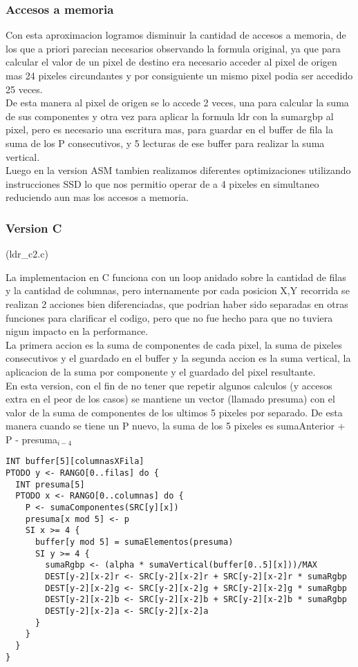 \subsubsection*{Accesos a memoria}

Con esta aproximacion logramos disminuir la cantidad de accesos a memoria, de los que a priori parecian necesarios observando la formula original, ya que para calcular el valor de un pixel de destino era necesario acceder al pixel de origen mas 24 pixeles circundantes y por consiguiente un mismo pixel podia ser accedido 25 veces. \\
De esta manera al pixel de origen se lo accede 2 veces, una para calcular la suma de sus componentes y otra vez para aplicar la formula ldr con la sumargbp al pixel, pero es necesario una escritura mas, para guardar en el buffer de fila la suma de los P consecutivos, y 5 lecturas de ese buffer para realizar la suma vertical. \\
Luego en la version ASM tambien realizamos diferentes optimizaciones utilizando instrucciones SSD lo que nos permitio operar de a 4 pixeles en simultaneo reduciendo aun mas los accesos a memoria.

\subsubsection*{Version C} (ldr_c2.c)

La implementacion en C funciona con un loop anidado sobre la cantidad de filas y la cantidad de columnas, pero internamente por cada posicion X,Y recorrida se realizan 2 acciones bien diferenciadas, que podrian haber sido separadas en otras funciones para clarificar el codigo, pero que no fue hecho para que no tuviera nigun impacto en la performance.\\
La primera accion es la suma de componentes de cada pixel, la suma de pixeles consecutivos y el guardado en el buffer y la segunda accion es la suma vertical, la aplicacion de la suma por componente y el guardado del pixel resultante.\\
En esta version, con el fin de no tener que repetir algunos calculos (y accesos extra en el peor de los casos) se mantiene un vector (llamado presuma) con el valor de la suma de componentes de los ultimos 5 pixeles por separado.
De esta manera cuando se tiene un P nuevo, la suma de los 5 pixeles es sumaAnterior + P - presuma$_{i-4}$ 

\begin{lstlisting}[frame=single]
INT buffer[5][columnasXFila]
PTODO y <- RANGO[0..filas] do { 
  INT presuma[5]
  PTODO x <- RANGO[0..columnas] do {
    P <- sumaComponentes(SRC[y][x])
    presuma[x mod 5] <- p
    SI x >= 4 {
	  buffer[y mod 5] = sumaElementos(presuma)
	  SI y >= 4 {
	    sumaRgbp <- (alpha * sumaVertical(buffer[0..5][x]))/MAX
	    DEST[y-2][x-2]r <- SRC[y-2][x-2]r + SRC[y-2][x-2]r * sumaRgbp
	    DEST[y-2][x-2]g <- SRC[y-2][x-2]g + SRC[y-2][x-2]g * sumaRgbp
	    DEST[y-2][x-2]b <- SRC[y-2][x-2]b + SRC[y-2][x-2]b * sumaRgbp
	    DEST[y-2][x-2]a <- SRC[y-2][x-2]a
	  }
	}
  }
}
\end{lstlisting}


